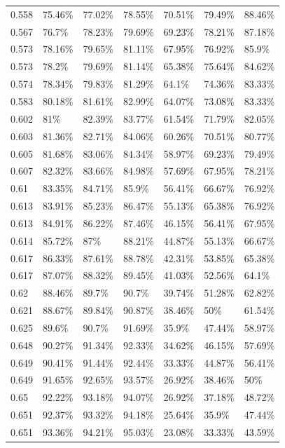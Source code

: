 \documentclass[a4paper,titlepage]{ppgi}\usepackage[]{graphicx}\usepackage[]{color}
\begin{document}
\begin{longtable}{l l l l l l l}
0.558 & 75.46\% & 77.02\% & 78.55\% & 70.51\% & 79.49\% & 88.46\% \\
0.567 & 76.7\% & 78.23\% & 79.69\% & 69.23\% & 78.21\% & 87.18\% \\
0.573 & 78.16\% & 79.65\% & 81.11\% & 67.95\% & 76.92\% & 85.9\% \\
0.573 & 78.2\% & 79.69\% & 81.14\% & 65.38\% & 75.64\% & 84.62\% \\
0.574 & 78.34\% & 79.83\% & 81.29\% & 64.1\% & 74.36\% & 83.33\% \\
0.583 & 80.18\% & 81.61\% & 82.99\% & 64.07\% & 73.08\% & 83.33\% \\
0.602 & 81\% & 82.39\% & 83.77\% & 61.54\% & 71.79\% & 82.05\% \\
0.603 & 81.36\% & 82.71\% & 84.06\% & 60.26\% & 70.51\% & 80.77\% \\
0.605 & 81.68\% & 83.06\% & 84.34\% & 58.97\% & 69.23\% & 79.49\% \\
0.607 & 82.32\% & 83.66\% & 84.98\% & 57.69\% & 67.95\% & 78.21\% \\
0.61 & 83.35\% & 84.71\% & 85.9\% & 56.41\% & 66.67\% & 76.92\% \\
0.613 & 83.91\% & 85.23\% & 86.47\% & 55.13\% & 65.38\% & 76.92\% \\
0.613 & 84.91\% & 86.22\% & 87.46\% & 46.15\% & 56.41\% & 67.95\% \\
0.614 & 85.72\% & 87\% & 88.21\% & 44.87\% & 55.13\% & 66.67\% \\
0.617 & 86.33\% & 87.61\% & 88.78\% & 42.31\% & 53.85\% & 65.38\% \\
0.617 & 87.07\% & 88.32\% & 89.45\% & 41.03\% & 52.56\% & 64.1\% \\
0.62 & 88.46\% & 89.7\% & 90.7\% & 39.74\% & 51.28\% & 62.82\% \\
0.621 & 88.67\% & 89.84\% & 90.87\% & 38.46\% & 50\% & 61.54\% \\
0.625 & 89.6\% & 90.7\% & 91.69\% & 35.9\% & 47.44\% & 58.97\% \\
0.648 & 90.27\% & 91.34\% & 92.33\% & 34.62\% & 46.15\% & 57.69\% \\
0.649 & 90.41\% & 91.44\% & 92.44\% & 33.33\% & 44.87\% & 56.41\% \\
0.649 & 91.65\% & 92.65\% & 93.57\% & 26.92\% & 38.46\% & 50\% \\
0.65 & 92.22\% & 93.18\% & 94.07\% & 26.92\% & 37.18\% & 48.72\% \\
0.651 & 92.37\% & 93.32\% & 94.18\% & 25.64\% & 35.9\% & 47.44\% \\
0.651 & 93.36\% & 94.21\% & 95.03\% & 23.08\% & 33.33\% & 43.59\% \\

\end{longtable}
\end{document}
